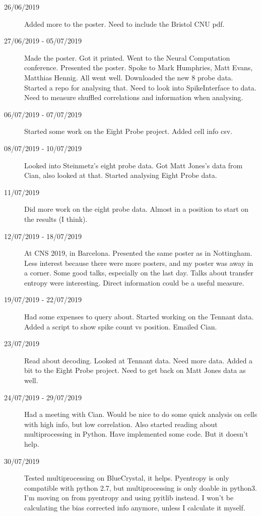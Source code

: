 \documentclass[a4paper,12pt]{article}
\theoremstyle{definition}
\begin{document}
\begin{description}
	\item[26/06/2019] Added more to the poster. Need to include the Bristol CNU pdf.

	\item[27/06/2019 - 05/07/2019] Made the poster. Got it printed. Went to the Neural Computation conference. Presented the poster. Spoke to Mark Humphries, Matt Evans, Matthias Hennig. All went well. Downloaded the new 8 probe data. Started a repo for analysing that. Need to look into SpikeInterface to data. Need to measure shuffled correlations and information when analysing.

	\item[06/07/2019 - 07/07/2019] Started some work on the Eight Probe project. Added cell info csv.

	\item[08/07/2019 - 10/07/2019] Looked into Steinmetz's eight probe data. Got Matt Jones's data from Cian, also looked at that. Started analysing Eight Probe data.

	\item[11/07/2019] Did more work on the eight probe data. Almost in a position to start on the results (I think).

	\item[12/07/2019 - 18/07/2019] At CNS 2019, in Barcelona. Presented the same poster as in Nottingham. Less interest because there were more posters, and my poster was away in a corner. Some good talks, especially on the last day. Talks about transfer entropy were interesting. Direct information could be a useful measure.

	\item[19/07/2019 - 22/07/2019] Had some expenses to query about. Started working on the Tennant data. Added a script to show spike count vs position. Emailed Cian.

	\item[23/07/2019] Read about decoding. Looked at Tennant data. Need more data. Added a bit to the Eight Probe project. Need to get back on Matt Jones data as well.

	\item[24/07/2019 - 29/07/2019] Had a meeting with Cian. Would be nice to do some quick analysis on cells with high info, but low correlation. Also started reading about multiprocessing in Python. Have implemented some code. But it doesn't help.

	\item[30/07/2019] Tested multiprocessing on BlueCrystal, it helps. Pyentropy is only compatible with python 2.7, but multiprocessing is only doable in python3. I'm moving on from pyentropy and using pyitlib instead. I won't be calculating the bias corrected info anymore, unless I calculate it myself.


\end{description}
\end{document}
